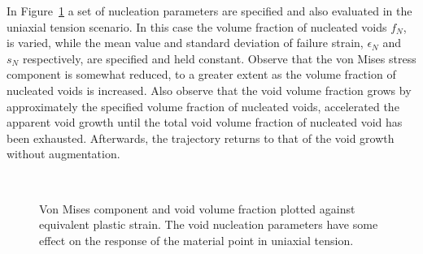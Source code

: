 In Figure~\ref{fig:tension-nuc} a set of nucleation parameters are
specified and also evaluated in the uniaxial tension scenario. In this
case the volume fraction of nucleated voids $f_{N}$, is varied, while
the mean value and standard deviation of failure strain, $\epsilon_N$
and $s_N$ respectively, are specified and held constant. Observe that
the von Mises stress component is somewhat reduced, to a greater extent as
the volume fraction of nucleated voids is increased. Also observe that
the void volume fraction grows by approximately the specified volume
fraction of nucleated voids, accelerated the apparent void growth
until the total void volume fraction of nucleated void has been
exhausted. Afterwards, the trajectory returns to that of the void
growth without augmentation.

\begin{figure}[htbp]
  \begin{center}
    ~ 
    \caption{Von Mises component and void volume fraction plotted
      against equivalent plastic strain. The void nucleation
      parameters have some effect on the response of the
      material point in uniaxial tension.}
    \label{fig:tension-nuc}
  \end{center}
\end{figure}

